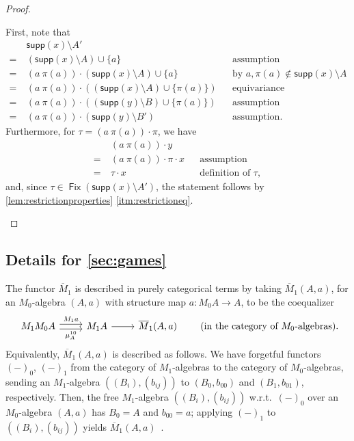 \documentclass[a4paper,UKenglish,cleveref,thm-restate,numberwithinsect,final]{lipics-v2021}
\newcommand{\supp}{\mathsf{supp}}
\newcommand{\Fix}{\mathop{\mathsf{Fix}}}
\newcommand{\mbar}{\overline{M}_1}
\theoremstyle{plain}
\numberwithin{equation}{section}
\newcommand{\+}[1]{\mathcal{#1}\xspace}
\theoremstyle{definition}
\begin{document}
\begin{proof}
\begin{itemize}
      First, note that
      \begin{align*}
        &\supp(x) \setminus A' \\
        =~&(\supp(x) \setminus A) \cup \{a\} && \text{assumption} \\
        =~&(a\ \pi(a)) \cdot (\supp(x) \setminus A) \cup \{a\} && \text{by } a,\pi(a) \notin \supp(x) \setminus A \\
        =~&(a\ \pi(a)) \cdot ((\supp(x) \setminus A) \cup \{\pi(a)\}) && \text{equivariance} \\
        =~&(a\ \pi(a)) \cdot ((\supp(y) \setminus B) \cup \{\pi(a)\}) && \text{assumption} \\
        =~&(a\ \pi(a)) \cdot (\supp(y) \setminus B') && \text{assumption}.
      \end{align*}
      Furthermore, for $\tau = (a\ \pi(a)) \cdot \pi$, we have
      \begin{align*}
        &(a\ \pi(a)) \cdot y \\
        =~&(a\ \pi(a)) \cdot \pi \cdot x && \text{assumption} \\
        =~&\tau \cdot x && \text{definition of } \tau,
      \end{align*}
      and, since $\tau \in \Fix(\supp(x) \setminus A')$, the statement follows by \cref{lem:restrictionproperties} \eqref{itm:restrictioneq}.
  \end{itemize}
\end{proof}

\subsection{Details for \cref{sec:games}}

The functor $\mbar$ is described in purely categorical terms by taking
$\mbar(A,a)$, for an $M_0$-algebra $(A,a)$ with structure map
$a\colon M_0A\to A$, to be the coequalizer
\begin{equation*}
  \begin{tikzcd}
    M_1M_0A \arrow[shift left,"M_1a",r] \arrow[shift right,"\mu^{10}_A" below,r] & M_1 A\arrow[r] &  \mbar(A,a)
  \end{tikzcd}\qquad\text{(in the category of $M_0$-algebras).}
\end{equation*}
Equivalently, $\mbar (A,a)$ is described as follows. We have forgetful
functors $(-)_0$, $(-)_1$ from the category of $M_1$-algebras to the
category of $M_0$-algebras, sending an $M_1$-algebra
$((B_i),(b_{ij}))$ to $(B_0,b_{00})$ and $(B_1,b_{01})$,
respectively. Then, the free $M_1$-algebra $((B_i),(b_{ij}))$ w.r.t.\
$(-)_0$ over an $M_0$-algebra $(A,a)$ has $B_0=A$ and $b_{00}=a$;
applying $(-)_1$ to $((B_i),(b_{ij}))$ yields
$\mbar(A,a)$~\cite{FordEA22,ForsterEA25a}.
\end{document}
